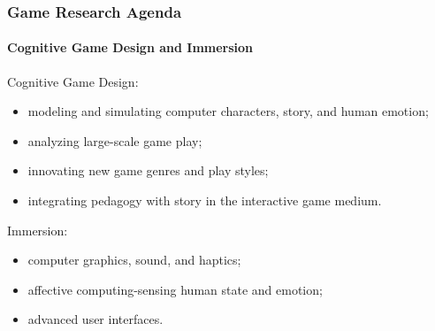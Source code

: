 \begin{frame}
\frametitle{Game Research Agenda}
\framesubtitle{Cognitive Game Design and Immersion}
\begin{block}{Cognitive Game Design:}
\begin{itemize}
\item
modeling and simulating computer characters,
story, and human emotion;
\item
analyzing large-scale game play;
\item
innovating new game genres and play styles;
\item
integrating pedagogy with story in the interactive game medium.
\end{itemize}
\end{block}

\pause

\begin{block}{Immersion:}
\begin{itemize}
\item
computer graphics, sound, and haptics;
\item
affective computing-sensing human state and
emotion;
\item
advanced user interfaces.
\end{itemize}
\end{block}
\end{frame}
